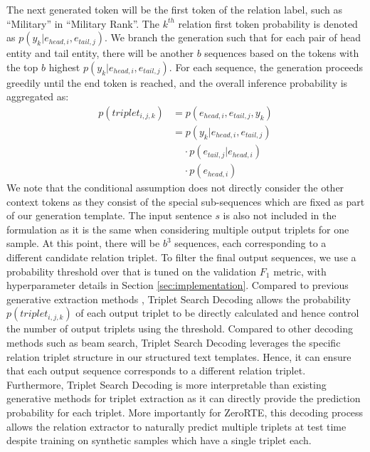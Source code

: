 \documentclass[11pt]{article}
\begin{document}
The next generated token will be the first token of the relation label, such as ``Military'' in ``Military Rank''.
The $k^{th}$ relation first token probability is denoted as $p(y_{k}|e_{head,i},e_{tail,j})$.
We branch the generation such that for each pair of head entity and tail entity, there will be another $b$ sequences based on the tokens with the top $b$ highest $p(y_{k}|e_{head,i},e_{tail,j})$.
For each sequence, the generation proceeds greedily until the end token is reached, and the overall inference probability is aggregated as:
\begin{equation}
\begin{split}
p(triplet_{i,j,k}) & = p(e_{head,i}, e_{tail,j}, y_{k}) \\
& = p(y_{k}|e_{head,i},e_{tail,j}) \\
& \;\;\;\; \cdot p(e_{tail,j}|e_{head,i}) \\
& \;\;\;\; \cdot p(e_{head,i})
\end{split}
\end{equation}
We note that the conditional assumption does not directly consider the other context tokens as they consist of the special sub-sequences which are fixed as part of our generation template.
The input sentence $s$ is also not included in the formulation as it is the same when considering multiple output triplets for one sample.
At this point, there will be $b^3$ sequences, each corresponding to a different candidate relation triplet.
To filter the final output sequences, we use a probability threshold over that is tuned on the validation $F_1$ metric, with hyperparameter details in Section \ref{sec:implementation}.
Compared to previous generative extraction methods \cite{paolini2020structured, nayak2020effective}, Triplet Search Decoding allows the probability $p(triplet_{i,j,k})$ of each output triplet to be directly calculated and hence control the number of output triplets using the threshold. 
Compared to other decoding methods such as beam search, Triplet Search Decoding leverages the specific relation triplet structure in our structured text templates.
Hence, it can ensure that each output sequence corresponds to a different relation triplet. 
Furthermore, Triplet Search Decoding is more interpretable than existing generative methods for triplet extraction as it can directly provide the prediction probability for each triplet.
More importantly for ZeroRTE, this decoding process allows the relation extractor to naturally predict multiple triplets at test time despite training on synthetic samples which have a single triplet each.
\end{document}
